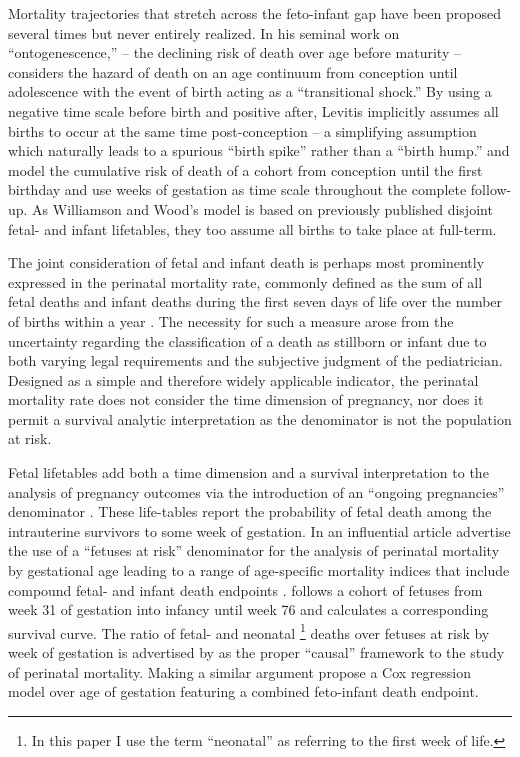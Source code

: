 \documentclass[10pt, twoside]{article}
\let\oldfootnote\footnote
\renewcommand\footnote[1]{%
\oldfootnote{\hspace{0.6mm}#1}}
\begin{document}
Mortality trajectories that stretch across the feto-infant gap have been proposed several times but never entirely realized. In his seminal work on ``ontogenescence,'' -- the declining risk of death over age before maturity -- \citet{Levitis2011} considers the hazard of death on an age continuum from conception until adolescence with the event of birth acting as a ``transitional shock.'' By using a negative time scale before birth and positive after, Levitis implicitly assumes all births to occur at the same time post-conception -- a simplifying assumption which naturally leads to a spurious ``birth spike'' rather than a ``birth hump.'' \citet{Williamson2003} and \citet{Woods2009} model the cumulative risk of death of a cohort from conception until the first birthday and use weeks of gestation as time scale throughout the complete follow-up. As Williamson and Wood's model is based on previously published disjoint fetal- and infant lifetables, they too assume all births to take place at full-term.

The joint consideration of fetal and infant death is perhaps most prominently expressed in the perinatal mortality rate, commonly defined as the sum of all fetal deaths and infant deaths during the first seven days of life over the number of births within a year \citep{WHO2006}. The necessity for such a measure arose from the uncertainty regarding the classification of a death as stillborn or infant due to both varying legal requirements and the subjective judgment of the pediatrician. Designed as a simple and therefore widely applicable indicator, the perinatal mortality rate does not consider the time dimension of pregnancy, nor does it permit a survival analytic interpretation as the denominator is not the population at risk.

Fetal lifetables add both a time dimension and a survival interpretation to the analysis of pregnancy outcomes via the introduction of an ``ongoing pregnancies'' denominator \citep[e.g.,][]{Shapiro1962, French1962, Bakketeig1978, Goldhaber1991}. These life-tables report the probability of fetal death among the intrauterine survivors to some week of gestation. In an influential article \citet{Yudkin1987} advertise the use of a ``fetuses at risk'' denominator for the analysis of perinatal mortality by gestational age leading to a range of age-specific mortality indices that include compound fetal- and infant death endpoints \citep{Kristensen1992, Smith2001, Platt2004, Joseph2004, Smith2005, Joseph2007}. \citet{Kristensen1992} follows a cohort of fetuses from week 31 of gestation into infancy until week 76 and calculates a corresponding survival curve. The ratio of fetal- and neonatal\footnote{In this paper I use the term ``neonatal'' as referring to the first week of life.} deaths over fetuses at risk by week of gestation is advertised by \citet{Joseph2007} as the proper ``causal'' framework to the study of perinatal mortality. Making a similar argument \citet{Platt2004} propose a Cox regression model over age of gestation featuring a combined feto-infant death endpoint.
\end{document}
